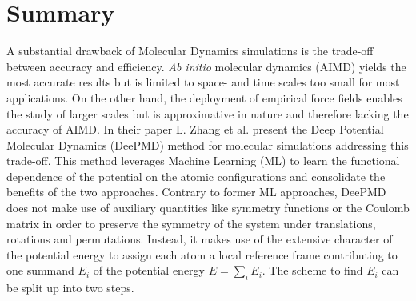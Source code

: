\section{Summary}
A substantial drawback of Molecular Dynamics simulations is the trade-off between accuracy and efficiency. 
\emph{Ab initio} molecular dynamics (AIMD) yields the most accurate results but is limited to space- and time scales too small for most applications. On the other hand, the deployment of empirical force fields enables the study of larger scales but is approximative in nature and therefore lacking the accuracy of AIMD. 
\newline\newline
In their paper \cite{PhysRevLett.120.143001} L. Zhang et al. present the Deep Potential Molecular Dynamics (DeePMD) method for molecular simulations addressing this trade-off. This method leverages Machine Learning (ML) to learn the functional dependence of the potential on the atomic configurations and consolidate the benefits of the two approaches. Contrary to former ML approaches, DeePMD does not make use of auxiliary quantities like symmetry functions or the Coulomb matrix in order to preserve the symmetry of the system under translations, rotations and permutations. Instead, it makes use of the extensive character of the potential energy to assign each atom a local reference frame contributing to one summand $E_i$ of the potential energy $E = \sum_i E_i$. The scheme to find $E_i$ can be split up into two steps. 
